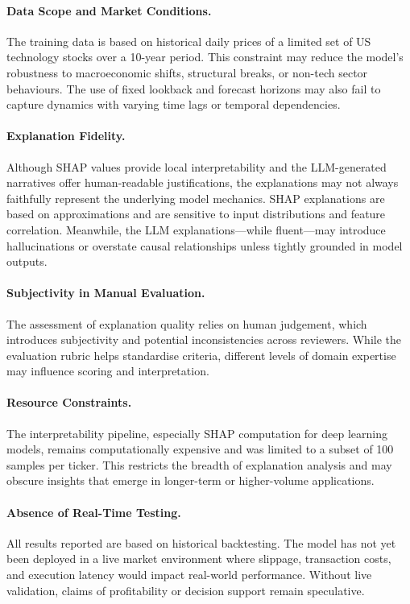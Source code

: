 \paragraph{Data Scope and Market Conditions.}  
The training data is based on historical daily prices of a limited set of US technology stocks over a 10-year period. This constraint may reduce the model’s robustness to macroeconomic shifts, structural breaks, or non-tech sector behaviours. The use of fixed lookback and forecast horizons may also fail to capture dynamics with varying time lags or temporal dependencies.

\paragraph{Explanation Fidelity.}  
Although SHAP values provide local interpretability and the LLM-generated narratives offer human-readable justifications, the explanations may not always faithfully represent the underlying model mechanics. SHAP explanations are based on approximations and are sensitive to input distributions and feature correlation. Meanwhile, the LLM explanations—while fluent—may introduce hallucinations or overstate causal relationships unless tightly grounded in model outputs.

\paragraph{Subjectivity in Manual Evaluation.}  
The assessment of explanation quality relies on human judgement, which introduces subjectivity and potential inconsistencies across reviewers. While the evaluation rubric helps standardise criteria, different levels of domain expertise may influence scoring and interpretation.

\paragraph{Resource Constraints.}  
The interpretability pipeline, especially SHAP computation for deep learning models, remains computationally expensive and was limited to a subset of 100 samples per ticker. This restricts the breadth of explanation analysis and may obscure insights that emerge in longer-term or higher-volume applications.

\paragraph{Absence of Real-Time Testing.}  
All results reported are based on historical backtesting. The model has not yet been deployed in a live market environment where slippage, transaction costs, and execution latency would impact real-world performance. Without live validation, claims of profitability or decision support remain speculative.

